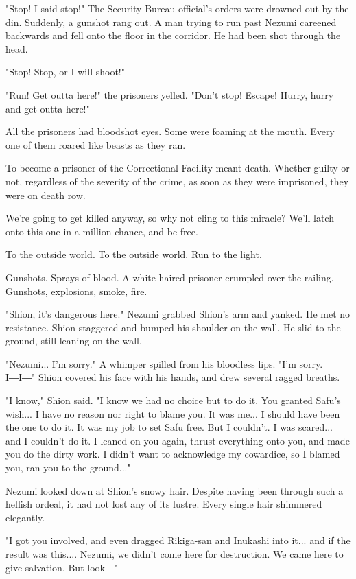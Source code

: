 "Stop! I said stop!" The Security Bureau official's orders were drowned
out by the din. Suddenly, a gunshot rang out. A man trying to run past
Nezumi careened backwards and fell onto the floor in the corridor. He
had been shot through the head.

"Stop! Stop, or I will shoot!"

"Run! Get outta here!" the prisoners yelled. "Don't stop! Escape! Hurry,
hurry and get outta here!"

All the prisoners had bloodshot eyes. Some were foaming at the mouth.
Every one of them roared like beasts as they ran.

To become a prisoner of the Correctional Facility meant death. Whether
guilty or not, regardless of the severity of the crime, as soon as they
were imprisoned, they were on death row.

We're going to get killed anyway, so why not cling to this miracle?
We'll latch onto this one-in-a-million chance, and be free.

To the outside world. To the outside world. Run to the light.

Gunshots. Sprays of blood. A white-haired prisoner crumpled over the
railing. Gunshots, explosions, smoke, fire.

"Shion, it's dangerous here." Nezumi grabbed Shion's arm and yanked. He
met no resistance. Shion staggered and bumped his shoulder on the wall.
He slid to the ground, still leaning on the wall.

"Nezumi... I'm sorry." A whimper spilled from his bloodless lips. "I'm
sorry. I―I―" Shion covered his face with his hands, and drew several
ragged breaths.

"I know," Shion said. "I know we had no choice but to do it. You granted
Safu's wish... I have no reason nor right to blame you. It was me... I
should have been the one to do it. It was my job to set Safu free. But I
couldn't. I was scared... and I couldn't do it. I leaned on you again,
thrust everything onto you, and made you do the dirty work. I didn't
want to acknowledge my cowardice, so I blamed you, ran you to the
ground..."

Nezumi looked down at Shion's snowy hair. Despite having been through
such a hellish ordeal, it had not lost any of its lustre. Every single
hair shimmered elegantly.

"I got you involved, and even dragged Rikiga-san and Inukashi into it...
and if the result was this.... Nezumi, we didn't come here for
destruction. We came here to give salvation. But look―"

